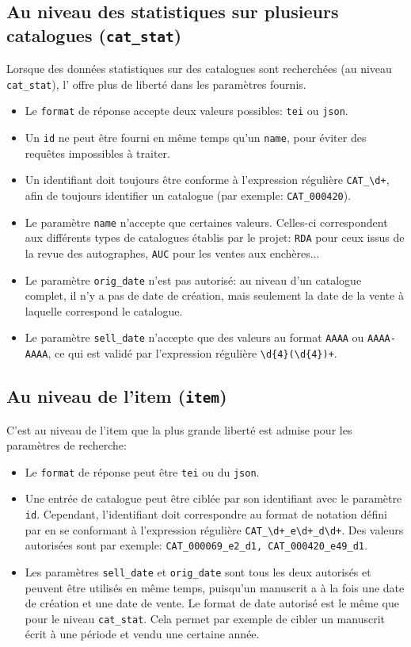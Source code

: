 \subsection{Au niveau des statistiques sur plusieurs catalogues (\texttt{cat\_stat})}
Lorsque des données statistiques sur des catalogues sont recherchées (au niveau \texttt{cat\_stat}), l'\api{} offre plus de liberté dans les paramètres fournis.
\begin{itemize}
	\item Le \texttt{format} de réponse accepte deux valeurs possibles: \texttt{tei} ou \texttt{json}.
	\item Un \texttt{id} ne peut être fourni en même temps qu'un \texttt{name}, pour éviter des requêtes impossibles à traiter. 
	\item Un identifiant doit toujours être conforme à l'\gls{expression régulière} \texttt{CAT\_\textbackslash{}d+}, afin de toujours identifier un catalogue (par exemple: \texttt{CAT\_000420}).
	\item Le paramètre \texttt{name} n'accepte que certaines valeurs. Celles-ci correspondent aux différents types de catalogues établis par le projet: \texttt{RDA} pour ceux issus de la revue des autographes, \texttt{AUC} pour les ventes aux enchères...
	\item Le paramètre \texttt{orig\_date} n'est pas autorisé: au niveau d'un catalogue complet, il n'y a pas de date de création, mais seulement la date de la vente à laquelle correspond le catalogue.
	\item Le paramètre \texttt{sell\_date} n'accepte que des valeurs au format \texttt{AAAA} ou \texttt{AAAA-AAAA}, ce qui est validé par l'\gls{expression régulière} \texttt{\textbackslash{}d\{4\}(\textbackslash{}d\{4\})+}.
\end{itemize}

\subsection{Au niveau de l'item (\texttt{item})}
C'est au niveau de l'item que la plus grande liberté est admise pour les paramètres de recherche:
\begin{itemize}
	\item Le \texttt{format} de réponse peut être \texttt{tei} ou du \texttt{json}.
	\item Une entrée de catalogue peut être ciblée par son identifiant avec le paramètre \texttt{id}. Cependant, l'identifiant doit correspondre au format de notation défini par \mssktb{} en se conformant à l'expression régulière \texttt{CAT\_\textbackslash{}d+\_e\textbackslash{}d+\_d\textbackslash{}d+}. Des valeurs autorisées sont par exemple: \texttt{CAT\_000069\_e2\_d1, CAT\_000420\_e49\_d1}.
	\item Les paramètres \texttt{sell\_date} et \texttt{orig\_date} sont tous les deux autorisés et peuvent être utilisés en même temps, puisqu'un manuscrit a à la fois une date de création et une date de vente. Le format de date autorisé est le même que pour le niveau \texttt{cat\_stat}. Cela permet par exemple de cibler un manuscrit écrit à une période et vendu une certaine année.
\end{itemize}

